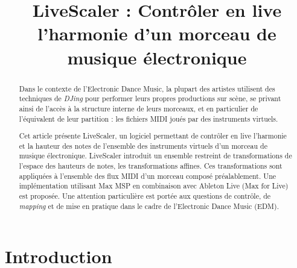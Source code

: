 \documentclass{article}
\title{LiveScaler : Contrôler en live l'harmonie d'un morceau de musique électronique}
\begin{document}
  

\maketitle

\begin{abstract}
Dans le contexte de l'Electronic Dance Music, la plupart des artistes utilisent des techniques de \emph{DJing} pour performer leurs propres productions sur scène, se privant ainsi de l'accès à la structure interne de leurs morceaux, et en particulier de l'équivalent de leur partition : les fichiers MIDI joués par des instruments virtuels.

Cet article présente LiveScaler, un logiciel permettant de contrôler en live l'harmonie et la hauteur des notes de l'ensemble des instruments virtuels d'un morceau de musique électronique. LiveScaler introduit un ensemble restreint de transformations de l'espace des hauteurs de notes, les transformations affines. Ces transformations sont appliquées à l'ensemble des flux MIDI d'un morceau composé préalablement. Une implémentation utilisant Max MSP en combinaison avec Ableton Live (Max for Live) est proposée. Une attention particulière est portée aux questions de contrôle, de \emph{mapping} et de mise en pratique dans le cadre de l'Electronic Dance Music (EDM).
\end{abstract}

\begin{comment}
  a comme image à la place d'envoie
cohérence dans la notation des notes 
repliement de l'intervalle
ça marche pas bien quand on sort des modes diatoniques
mode de messiaen : modes à transposition limitée

Expliquiqué dans Techniques de mon langage musical ou dans son cours de composition, tome 1

expliquer dans l'introduction que ce que je veux faire, c'est du live, et faire de la musique

quelques canons stochastiques

Joe Zawinul Modules SEM ou Oberheim claviers en miroirs
\end{comment}

\section{Introduction}

\end{document}
